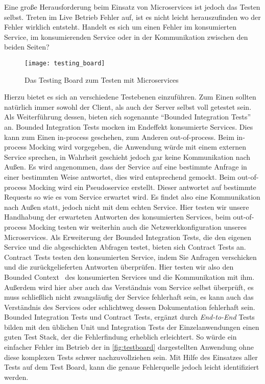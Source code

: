 Eine große Herausforderung beim Einsatz von Microservices ist jedoch das Testen selbst. Treten im Live Betrieb Fehler auf, ist es nicht leicht herauszufinden wo der Fehler wirklich entsteht. Handelt es sich um einen Fehler im konsumierten Service, im konsumierenden Service oder in der Kommunikation zwischen den beiden Seiten?

\begin{wrapfigure}{l}{0.5\textwidth}
    \caption{Das Testing Board zum Testen mit Microservices \cite{rails:soa}}
    \label{fig:testboard}
    \texttt{[image: testing\_board]}
\end{wrapfigure}

Hierzu bietet es sich an verschiedene Testebenen einzuführen. Zum Einen sollten natürlich immer sowohl der Client, als auch der Server selbst voll getestet sein. Als Weiterführung dessen, bieten sich sogenannte ``Bounded Integration Tests''\cite[vgl.][]{rails:soa} an. Bounded Integration Tests mocken im Endeffekt konsumierte Services. Dies kann zum Einen in-process geschehen, zum Anderen out-of-process. Beim in-process Mocking wird vorgegeben, die Anwendung würde mit einem externen Service sprechen, in Wahrheit geschieht jedoch gar keine Kommunikation nach Außen. Es wird angenommen, dass der Service auf eine bestimmte Anfrage in einer bestimmten Weise antwortet, dies wird entsprechend gemockt. Beim out-of-process Mocking wird ein Pseudoservice erstellt. Dieser antwortet auf bestimmte Requests so wie es vom Service erwartet wird. Es findet also eine Kommunikation nach Außen statt, jedoch nicht mit dem echten Service. Hier testen wir unsere Handhabung der erwarteten Antworten des konsumierten Services, beim out-of-process Mocking testen wir weiterhin auch die Netzwerkkonfiguration unseres Microservices.\cite{fowler:mstesting}
Als Erweiterung der Bounded Integration Tests, die den eigenen Service und die abgeschickten Abfragen testet, bieten sich Contract Tests an.~\cite[vgl.][]{fowler:contracts} Contract Tests testen den konsumierten Service, indem Sie Anfragen verschicken und die zurückgelieferten Antworten überprüfen. Hier testen wir also den Bounded Context~\cite[vgl.][]{fowler:bounded} des konsumierten Services und die Kommunikation mit ihm. Außerdem wird hier aber auch das Verständnis vom Service selbst überprüft, es muss schließlich nicht zwangsläufig der Service fehlerhaft sein, es kann auch das Verständnis des Services oder schlichtweg dessen Dokumentation fehlerhaft sein.
Bounded Integration Tests und Contract Tests, ergänzt durch \textit{End-to-End} Tests bilden mit den üblichen Unit und Integration Tests der Einzelanwendungen einen guten Test Stack, der die Fehlerfindung erheblich erleichtert. So würde ein einfacher Fehler im Betrieb der in \autoref{fig:testboard} dargestellten Anwendung ohne diese komplexen Tests schwer nachzuvollziehen sein. Mit Hilfe des Einsatzes aller Tests auf dem Test Board, kann die genaue Fehlerquelle jedoch leicht identifiziert werden.

